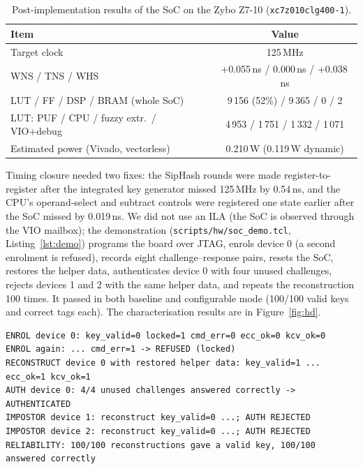\documentclass[11pt,a4paper]{article}
\begin{document}
\begin{table}[H]\centering\small
\caption{Post-implementation results of the SoC on the Zybo Z7-10 (\texttt{xc7z010clg400-1}).}\label{tab:fpga}
\begin{tabular}{@{}lc@{}}
\toprule
Item & Value\\
\midrule
Target clock & 125\,MHz\\
WNS / TNS / WHS & +0.055\,ns / 0.000\,ns / +0.038\,ns\\
LUT / FF / DSP / BRAM (whole SoC) & 9\,156 (52\%) / 9\,365 / 0 / 2\\
\quad LUT: PUF / CPU / fuzzy extr.\ / VIO+debug & 4\,953 / 1\,751 / 1\,332 / 1\,071\\
Estimated power (Vivado, vectorless) & 0.210\,W (0.119\,W dynamic)\\
\bottomrule
\end{tabular}
\end{table}
Timing closure needed two fixes: the SipHash rounds were made register-to-register after the integrated
key generator missed 125\,MHz by 0.54\,ns, and the CPU's operand-select and subtract controls were
registered one state earlier after the SoC missed by 0.019\,ns. We did not use an ILA (the SoC is
observed through the VIO mailbox); the demonstration (\texttt{scripts/hw/soc\_demo.tcl},
Listing~\ref{lst:demo}) programs the board over JTAG, enrols device 0 (a second enrolment is refused),
records eight challenge--response pairs, resets the SoC, restores the helper data, authenticates device 0
with four unused challenges, rejects devices 1 and 2 with the same helper data, and repeats the
reconstruction 100 times. It passed in both baseline and configurable mode (100/100 valid keys and
correct tags each). The characterisation results are in Figure~\ref{fig:hd}.

\begin{lstlisting}[numbers=none,caption={Excerpt of the demo log on the board (\texttt{data/hw\_soc/demo\_base.txt}, baseline mode; lines shortened).},label={lst:demo}]
ENROL device 0: key_valid=0 locked=1 cmd_err=0 ecc_ok=0 kcv_ok=0
ENROL again: ... cmd_err=1 -> REFUSED (locked)
RECONSTRUCT device 0 with restored helper data: key_valid=1 ... ecc_ok=1 kcv_ok=1
AUTH device 0: 4/4 unused challenges answered correctly -> AUTHENTICATED
IMPOSTOR device 1: reconstruct key_valid=0 ...; AUTH REJECTED
IMPOSTOR device 2: reconstruct key_valid=0 ...; AUTH REJECTED
RELIABILITY: 100/100 reconstructions gave a valid key, 100/100 answered correctly
\end{lstlisting}
\end{document}
